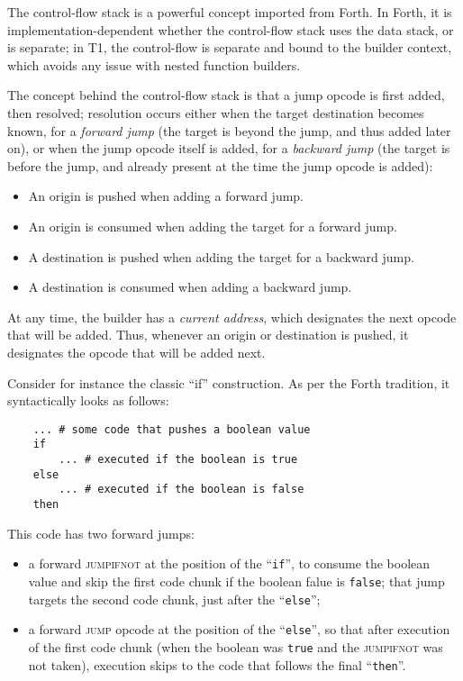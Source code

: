\begin{rationale}
The control-flow stack is a powerful concept imported from Forth. In
Forth, it is implementation-dependent whether the control-flow stack
uses the data stack, or is separate; in T1, the control-flow is
separate and bound to the builder context, which avoids any issue with
nested function builders.
\end{rationale}

The concept behind the control-flow stack is that a jump opcode is
first added, then resolved; resolution occurs either when the target
destination becomes known, for a \emph{forward jump} (the target is
beyond the jump, and thus added later on), or when the jump opcode
itself is added, for a \emph{backward jump} (the target is before the
jump, and already present at the time the jump opcode is added):
\begin{itemize}

    \item An origin is pushed when adding a forward jump.

    \item An origin is consumed when adding the target for a forward
    jump.

    \item A destination is pushed when adding the target for a backward
    jump.

    \item A destination is consumed when adding a backward jump.

\end{itemize}
At any time, the builder has a \emph{current address}, which designates
the next opcode that will be added. Thus, whenever an origin or
destination is pushed, it designates the opcode that will be added next.

Consider for instance the classic ``if'' construction. As per the Forth
tradition, it syntactically looks as follows:
\begin{verbatim}
    ... # some code that pushes a boolean value
    if
        ... # executed if the boolean is true
    else
        ... # executed if the boolean is false
    then
\end{verbatim}
This code has two forward jumps:
\begin{itemize}

    \item a forward \textsc{jumpifnot} at the position of the
    ``\verb|if|'', to consume the boolean value and skip the first code
    chunk if the boolean falue is \verb|false|; that jump targets the
    second code chunk, just after the ``\verb|else|'';

    \item a forward \textsc{jump} opcode at the position of the
    ``\verb|else|'', so that after execution of the first code chunk
    (when the boolean was \verb|true| and the \textsc{jumpifnot} was not
    taken), execution skips to the code that follows the final
    ``\verb|then|''.

\end{itemize}


